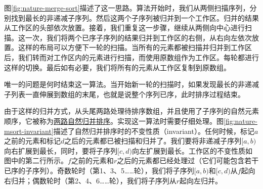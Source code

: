 \documentclass[UTF8]{article}
\begin{document}
图\ref{fig:nature-merge-sort}描述了这一思路。算法开始时，我们从两侧扫描序列，分别找到最长的非递减子序列。然后这两个子序列被归并到一个工作区。归并的结果从工作区的头部依次放置。接着，我们重复这一步骤，继续从两侧向中心进行扫描。这一次，我们将两个已序子序列的结果归并到工作区的右侧，从右向左依次放置。这样的布局可以方便下一轮的扫描。当所有的元素都被扫描并归并到工作区后，我们转而对工作区内的元素进行扫描，而使用原数组作为工作区。每轮都进行这样的切换。最后如有必要，我们将所有的元素从工作区复制到原数组。

唯一的问题是何时结束这一算法。当开始新一轮的扫描时，如果发现最长的非递减子列表一直伸展到数组的末尾，也就是说整个序列已序，此时排序过程结束。

由于这样的归并方式，从头尾两路处理待排序数组，并且使用了子序列的自然元素顺序，它被称为\underline{两路自然归并排序}。实现这一算法时需要仔细处理。图\ref{fig:nature-msort-invariant}描述了自然归并排序时的不变性质（invariant）。任何时候，标记$a$之前的元素和标记$d$之后的元素都已被扫描和归并了。我们要将非递减子序列$[a, b)$向右扩展到最长，同时，要将子序列$[c, d)$向左扩展到最长。工作区的不变性质如图中的第二行所示。$f$之前的元素和$r$之后的元素都已经处理过（它们可能包含若干已序的子序列）。奇数轮时（第1、3、5……轮），我们将子序列$[a, b)$和$[c, d)$从$f$起向右归并；偶数轮时（第2、4、6……轮），我们将子序列从$r$起向左归并。
\end{document}
